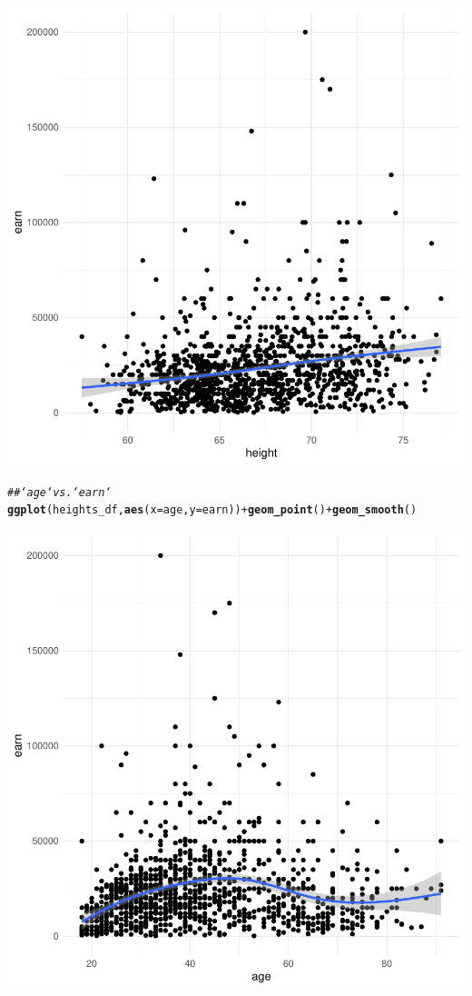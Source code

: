 \documentclass{article}\usepackage[]{graphicx}\usepackage[]{xcolor}
\makeatletter
\newcommand{\hlcom}[1]{\textcolor[rgb]{0.678,0.584,0.686}{\textit{#1}}}%
\newcommand{\hlopt}[1]{\textcolor[rgb]{0,0,0}{#1}}%
\newcommand{\hlstd}[1]{\textcolor[rgb]{0.345,0.345,0.345}{#1}}%
\newcommand{\hlkwc}[1]{\textcolor[rgb]{0.333,0.667,0.333}{#1}}%
\newcommand{\hlkwd}[1]{\textcolor[rgb]{0.737,0.353,0.396}{\textbf{#1}}}%
\newenvironment{kframe}{%
 \def\at@end@of@kframe{}%
 \ifinner\ifhmode%
  \def\at@end@of@kframe{\end{minipage}}%
  \begin{minipage}{\columnwidth}%
 \fi\fi%
 \def\FrameCommand##1{\hskip\@totalleftmargin \hskip-\fboxsep
 \colorbox{shadecolor}{##1}\hskip-\fboxsep
     \hskip-\linewidth \hskip-\@totalleftmargin \hskip\columnwidth}%
 \MakeFramed {\advance\hsize-\width
   \@totalleftmargin\z@ \linewidth\hsize
   \@setminipage}}%
 {\par\unskip\endMakeFramed%
 \at@end@of@kframe}
\newenvironment{knitrout}{}{} %
\makeatother
\begin{document}
\begin{knitrout}
\begin{kframe}
{\ttfamily\noindent\itshape{}}\end{kframe}

{\centering \includegraphics[width=.6\linewidth]{figure/assignment-03-TangXin-Rnwauto-report-4} 

}


\begin{kframe}\begin{alltt}
\hlcom{## `age` vs. `earn`}
\hlkwd{ggplot}\hlstd{(heights_df,} \hlkwd{aes}\hlstd{(}\hlkwc{x}\hlstd{=age,} \hlkwc{y}\hlstd{=earn))} \hlopt{+} \hlkwd{geom_point}\hlstd{()} \hlopt{+} \hlkwd{geom_smooth}\hlstd{()}
\end{alltt}


{\ttfamily\noindent\itshape{}}\end{kframe}

{\centering \includegraphics[width=.6\linewidth]{figure/assignment-03-TangXin-Rnwauto-report-5} 

}
\end{knitrout}
\end{document}

